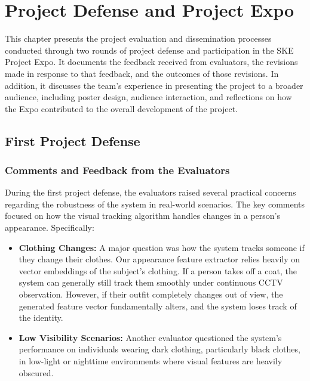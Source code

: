 \chapter{Project Defense and Project Expo}

This chapter presents the project evaluation and dissemination processes conducted through two rounds of project defense and participation in the SKE Project Expo. It documents the feedback received from evaluators, the revisions made in response to that feedback, and the outcomes of those revisions. In addition, it discusses the team's experience in presenting the project to a broader audience, including poster design, audience interaction, and reflections on how the Expo contributed to the overall development of the project.

\section{First Project Defense}

\subsection{Comments and Feedback from the Evaluators}
During the first project defense, the evaluators raised several practical concerns regarding the robustness of the system in real-world scenarios. The key comments focused on how the visual tracking algorithm handles changes in a person's appearance. Specifically:
\begin{itemize}
    \item \textbf{Clothing Changes:} A major question was how the system tracks someone if they change their clothes. Our appearance feature extractor relies heavily on vector embeddings of the subject's clothing. If a person takes off a coat, the system can generally still track them smoothly under continuous CCTV observation. However, if their outfit completely changes out of view, the generated feature vector fundamentally alters, and the system loses track of the identity.
    \item \textbf{Low Visibility Scenarios:} Another evaluator questioned the system's performance on individuals wearing dark clothing, particularly black clothes, in low-light or nighttime environments where visual features are heavily obscured.
\end{itemize}


